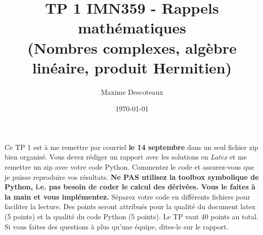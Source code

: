 \documentclass{article}
\title{TP 1 IMN359 - Rappels mathématiques \\
(Nombres complexes, algèbre linéaire, produit Hermitien)}
\author{Maxime Descoteaux}
\date{\today}
\begin{document}
\maketitle

Ce TP 1 est à me remettre par courriel {\bf le 14 septembre} 
dans un seul fichier zip bien organisé. 
Vous devez rédiger un rapport avec les solutions en 
\emph{Latex} et me remettre un zip avec votre code Python. Commentez
le code et assurez-vous que je puisse reproduire vos 
résultats. {\bf Ne PAS utilisez la toolbox symbolique de Python,
  i.e. pas besoin de coder le calcul des dérivées. Vous le faites à la
main et vous implémentez.}
Séparez votre code en différents fichiers pour faciliter la
lecture. Des points seront attribués pour la qualité du document latex
(5 points) et la qualité du code Python (5 points). Le TP vaut 40
points au total. Si vous faites des questions à plus qu'une équipe,
dites-le sur le rapport. 
\end{document}
